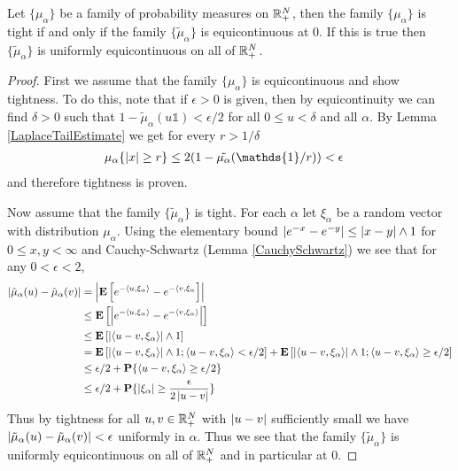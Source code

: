 \begin{lem}\label{LaplaceEquicontinuityAndTightness}Let $\lbrace
  \mu_\alpha \rbrace$
  be a family of probability measures on $\mathbb{R}^N_+$, then the family
  $\lbrace \mu_\alpha \rbrace$ is tight if and only if the family
  $\lbrace \tilde{\mu}_\alpha \rbrace$ is equicontinuous at $0$.  If
  this is true then $\lbrace \tilde{\mu}_\alpha \rbrace$ is uniformly equicontinuous on all of $\mathbb{R}^N_+$.
\end{lem}
\begin{proof}
First we assume that the family $\lbrace \mu_\alpha \rbrace$ is
equicontinuous and show tightness.  To do this, note that if $\epsilon
> 0$ is given,
 then by equicontinuity we can find
$\delta>0$ such that $1 - \tilde{\mu}_\alpha(u \mathds{1}) < \epsilon/2$ for all
$0 \leq u < \delta$ and all $\alpha$.  By Lemma
\ref{LaplaceTailEstimate} we get for every $r > 1/\delta$ 
\begin{align*}
\mu_\alpha\lbrace \abs{x} \geq r \rbrace &\leq 2 (1 - \tilde{\mu_\alpha}(\mathds{1}/r)) < \epsilon
\end{align*}
and therefore tightness is proven. 

Now assume that the family $\lbrace \tilde{\mu}_\alpha \rbrace$ is
tight.  For each $\alpha$ let $\xi_\alpha$ be a random vector with
distribution $\mu_\alpha$.  Using the elementary bound $\left \vert e^{-x} - e^{-y} \right \vert \leq \left \vert x
  -y \right \vert \wedge 1$ for $0 \leq x,y < \infty$ and Cauchy-Schwartz (Lemma
\ref{CauchySchwartz}) we see that for any
$0 < \epsilon < 2$,
\begin{align*}
\left \vert \tilde{\mu}_\alpha(u) - \tilde{\mu}_\alpha(v) \right \vert &=
\left \vert \textbf{E}\left[ e^{-\langle u, \xi_\alpha \rangle} - e^{-\langle v,
      \xi_\alpha}\right] \right \vert \\ 
&\leq
\textbf{E}\left[\left \vert  e^{-\langle u, \xi_\alpha \rangle} - e^{-\langle v,
      \xi_\alpha \rangle} \right \vert\right] \\ 
&\leq \textbf{E}\left[\left \vert \langle u-v, \xi_\alpha \rangle \right \vert \wedge 1\right] \\ 
&= \textbf{E}\left[\left \vert \langle u-v, \xi_\alpha \rangle \right \vert \wedge 1 ;
  \langle u-v, \xi_\alpha \rangle < \epsilon/2\right]  + 
\textbf{E}\left[\left \vert \langle u-v, \xi_\alpha \rangle \right \vert \wedge 1 ;
  \langle u-v, \xi_\alpha \rangle \geq \epsilon/2\right] \\ 
&\leq \epsilon/2 + 
\textbf{P}\{\langle u-v, \xi_\alpha \rangle \geq \epsilon/2\} \\ 
&\leq \epsilon/2 + 
\textbf{P}\{\left \vert \xi_\alpha  \right \vert \geq \frac{\epsilon}{2\left \vert u-v \right \vert}\} \\ 
\end{align*}
Thus by tightness for all $u,v \in \mathbb{R}^N_+$ with $\left \vert u-v \right \vert$
sufficiently small we have $\left \vert \tilde{\mu}_\alpha(u) -
  \tilde{\mu}_\alpha(v) \right \vert < \epsilon$ uniformly in $\alpha$.  Thus we see that
the family
$\lbrace \tilde{\mu}_\alpha \rbrace$ is uniformly equicontinuous on
all of $\mathbb{R}^N_+$ and in particular at $0$.
\end{proof}

